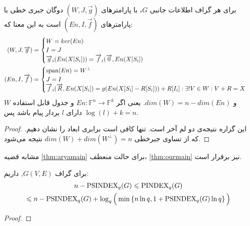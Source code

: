 \begin{theorem}
    \label{thm1}
    برای هر گراف اطلاعات جانبی 
    $G$، 
    \lpsicod
    با پارامترهای
     $(W, J, \overrightarrow{g})$
     دوگان جبری خطی
      \lpicod
      با پارامترهای
       $(En, I, \overrightarrow{f})$ 
      است به این معنا که:
    \begin{align*}
    (W, J, \overrightarrow{g}) &= \begin{cases}
                                      W = ker(En)\\
                                      I = J \\
                                      \overrightarrow{g}_i(En(X[S_i])) = \overrightarrow{f}_i(\overrightarrow{0}, En(X[S_i])\\
    \end{cases} \\
    (En, I, \overrightarrow{f}) &= \begin{cases}
                                       \operatorname{span}(En) = W^{\bot} \\
                                       J = I \\
                                       \overrightarrow{f}_i(\overrightarrow{R}, En(X[S_i]) = g(En(X[S_i] - R[S_i])) + R[I_i]: \exists! V \in W: V + R = X \\
    \end{cases}
    \end{align*}
    و 
    $dim(W) = n - dim(En)$.
     یعنی اگر
     $En: \mathbb{F}^n \rightarrow \mathbb{F}^k$
      و جدول قابل استفاده
      $W$
       دارای 
       $l$
       بردار پیام باشد پس 
       $\log(l) + k = n$.
\end{theorem}
\begin{proof}
    این گزاره نتیجه‌ی دو لم آخر است. تنها کافی است برابری ابعاد را نشان دهیم. که از تساوی جبرخطی
    $dim(W) + dim(W^{\bot}) = n$ 
    نتیجه می‌شود.
\end{proof}
مشابه قضیه
 \autoref{thm:aryamain}
برای حالت منعطف،
\autoref{thm:ourmain}
 نیز برقرار است.
\begin{theorem}
	\label{thm:ourmain}
	برای گراف
	$G(V,E)$,
	داریم:
	\begin{multline}
		n - \mathrm{PSINDEX}_q(G) \leqslant \mathrm{PINDEX}_q(G) \\ \leqslant n -\mathrm{PSINDEX}_q(G) + \log_q\Big(\min\left\{ n\ln q, 1+ \mathrm{PSINDEX}_q(G)\ln q  \right\}\Big)
	\end{multline}
\end{theorem}
\begin{proof}
	
\end{proof}


